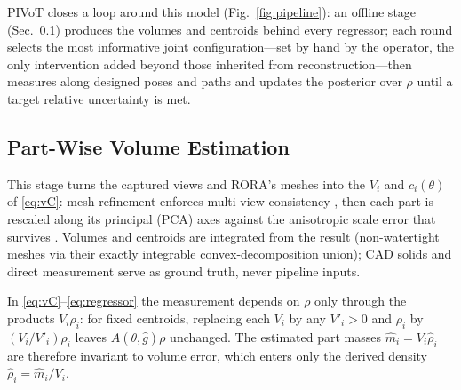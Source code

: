 PIVoT closes a loop around this model (Fig.~\ref{fig:pipeline}): an offline
stage (Sec.~\ref{sec:geom}) produces the volumes and centroids behind every
regressor; each round selects the most informative joint
configuration---set by hand by the operator, the only intervention added
beyond those inherited from reconstruction---then measures along designed
poses and paths and updates the posterior over $\rho$ until a target
relative uncertainty is met.

\subsection{Part-Wise Volume Estimation}
\label{sec:geom}

This stage turns the captured views and RORA's meshes into the $V_i$ and
$c_i(\theta)$ of \eqref{eq:vC}: mesh refinement enforces multi-view
consistency ,
then each part is rescaled along its principal (PCA) axes against the
anisotropic scale error that survives
. Volumes and
centroids are integrated from the result (non-watertight meshes via their
exactly integrable convex-decomposition union); CAD solids
and direct measurement serve as ground truth, never pipeline inputs.

\begin{remark}
\label{rem:volume}
In \eqref{eq:vC}--\eqref{eq:regressor} the measurement depends on $\rho$ only
through the products $V_i\rho_i$: for fixed centroids, replacing each $V_i$ by
any $V'_i>0$ and $\rho_i$ by $(V_i/V'_i)\rho_i$ leaves $A(\theta,\hat g)\rho$
unchanged. The estimated part masses $\hat m_i=V_i\hat\rho_i$ are therefore
invariant to volume error, which enters only the derived density
$\hat\rho_i=\hat m_i/V_i$.
\end{remark}

